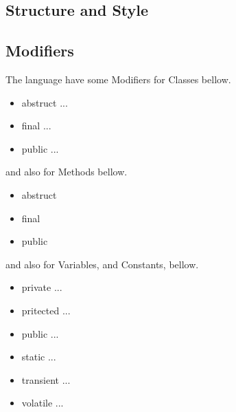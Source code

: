 \documentclass{jarticle}
\begin{document}
\subsection{Structure and Style}
\subsection{Modifiers}
 The language have some Modifiers for Classes bellow.
 \begin{itemize}
  \item abstruct ...
  \item final ...
  \item public ...
\end{itemize}
 and also for Methods bellow.
\begin{itemize}
 \item abstruct
 \item final
 \item public
\end{itemize}
 and also for Variables, and  Constants, bellow.
\begin{itemize}
 \item private ...
 \item pritected ...
 \item public ...
 \item static ...
 \item transient ...
 \item volatile ...
\end{itemize}
\end{document}
